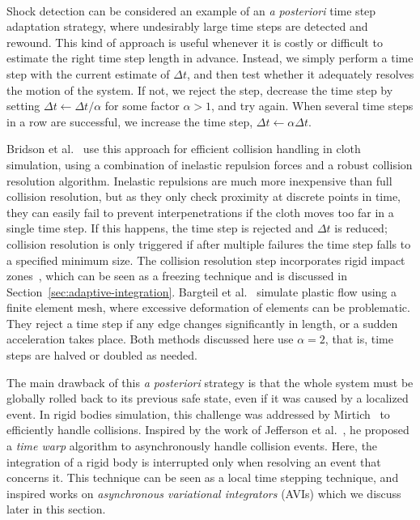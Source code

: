 \paragraph*{}
Shock detection can be considered an example of an \textit{a posteriori} time step adaptation strategy, where undesirably large time steps are detected and rewound.
This kind of approach is useful whenever it is costly or difficult to estimate the right time step length in advance.
Instead, we simply perform a time step with the current estimate of $\Delta t$, and then test whether it adequately resolves the motion of the system.
If not, we reject the step, decrease the time step by setting $\Delta t\gets\Delta t/\alpha$ for some factor $\alpha>1$, and try again.
When several time steps in a row are successful, we increase the time step, $\Delta t\gets\alpha\Delta t$.

Bridson et al.~\cite{Bridson2002} use this approach for efficient collision handling in cloth simulation, using a combination of inelastic repulsion forces and a robust collision resolution algorithm.
Inelastic repulsions are much more inexpensive than full collision resolution, but as they only check proximity at discrete points in time, they can easily fail to prevent interpenetrations if the cloth moves too far in a single time step.
If this happens, the time step is rejected and $\Delta t$ is reduced; collision resolution is only triggered if after multiple failures the time step falls to a specified minimum size.
The collision resolution step incorporates rigid impact zones~\cite{Provot1997}, which can be seen as a freezing technique and is discussed in Section~\ref{sec:adaptive-integration}.
Bargteil et al.~\cite{Bargteil2007} simulate plastic flow using a finite element mesh, where excessive deformation of elements can be problematic.
They reject a time step if any edge changes significantly in length, or a sudden acceleration takes place.
Both methods discussed here use $\alpha=2$, that is, time steps are halved or doubled as needed.

The main drawback of this \textit{a posteriori} strategy is that the whole system must be globally rolled back to its previous safe state, even if it was caused by a localized event.
In rigid bodies simulation, this challenge was addressed by Mirtich~\cite{Mirtich2000} to efficiently handle collisions.
Inspired by the work of Jefferson et al.~\cite{Jefferson1985}, he proposed a \emph{time warp} algorithm to asynchronously handle collision events.
Here, the integration of a rigid body is interrupted only when resolving an event that concerns it.
This technique can be seen as a local time stepping technique, and inspired works on \emph{asynchronous variational integrators} (AVIs) which we discuss later in this section.

